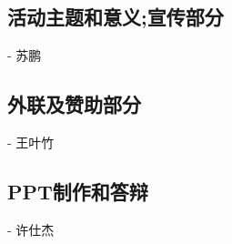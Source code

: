 \documentclass{article}
\begin{document}
\begin{CJK}{UTF8}{gbsn}
\subsection{活动主题和意义;宣传部分}
- 苏鹏
\subsection{外联及赞助部分}
- 王叶竹
\subsection{PPT制作和答辩}
- 许仕杰









	\end{CJK}
\end{document}
